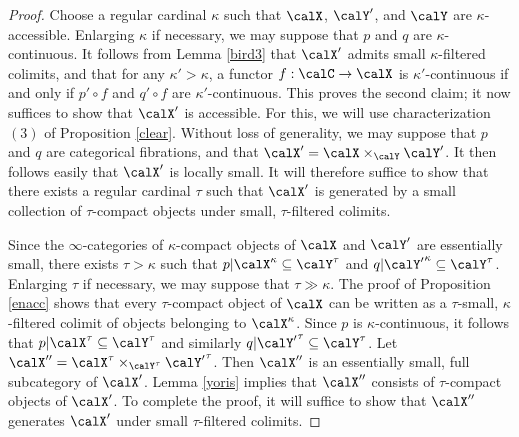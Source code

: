 \begin{proof}
Choose a regular cardinal $\kappa$ such that $\calX$, $\calY'$, and $\calY$ are $\kappa$-accessible. Enlarging $\kappa$ if necessary, we may suppose that $p$ and $q$ are $\kappa$-continuous. It follows from Lemma \ref{bird3} that $\calX'$ admits small $\kappa$-filtered
colimits, and that for any $\kappa' > \kappa$, a functor $f: \calC \rightarrow \calX$ is
$\kappa'$-continuous if and only if $p' \circ f$ and $q' \circ f$ are $\kappa'$-continuous.
This proves the second claim; it now suffices to show that $\calX'$ is accessible. For this, we will use characterization $(3)$ of Proposition \ref{clear}. Without loss of generality, we may suppose
that $p$ and $q$ are categorical fibrations, and that $\calX' = \calX \times_{\calY} \calY'$. It then follows easily that $\calX'$ is locally small. It will therefore suffice to show that there exists
a regular cardinal $\tau$ such that $\calX'$ is generated by a small collection of
$\tau$-compact objects under small, $\tau$-filtered colimits.

Since the $\infty$-categories of $\kappa$-compact objects of $\calX$ and $\calY'$ are essentially small, there exists $\tau > \kappa$ such that $p | \calX^{\kappa} \subseteq
\calY^{\tau}$ and $q| {\calY'}^{\kappa} \subseteq \calY^{\tau}$. Enlarging $\tau$ if necessary, we may suppose that $\tau \gg \kappa$. The proof of Proposition \ref{enacc} shows that
every $\tau$-compact object of $\calX$ can be written as a $\tau$-small, $\kappa$-filtered colimit of objects belonging to $\calX^{\kappa}$. Since $p$ is $\kappa$-continuous, it follows that
$p | \calX^{\tau} \subseteq \calY^{\tau}$ and similarly $q| {\calY'}^{\tau} \subseteq \calY^{\tau}$.
Let $\calX'' = \calX^{\tau} \times_{ \calY^{\tau} } {\calY'}^{\tau}$. Then $\calX''$ is an essentially small, full subcategory of $\calX'$. Lemma \ref{yoris} implies that $\calX''$ consists of $\tau$-compact objects of $\calX'$. To complete the proof, it will suffice to show that $\calX''$ generates $\calX'$ under small $\tau$-filtered colimits.


\end{proof}
